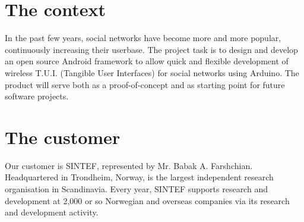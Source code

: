 \section{The context}
In the past few years, social networks have become more and more popular, continuously increasing their userbase.
The project task is to design and develop an open source Android framework to allow quick and flexible
development of wireless T.U.I. (Tangible User Interfaces) for social networks using Arduino.
The product will serve both as a proof-of-concept and as starting point for future software projects.
\section{The customer}
Our customer is SINTEF, represented by Mr. Babak A. Farshchian.
Headquartered in Trondheim, Norway, is the largest independent research organisation in Scandinavia.
Every year, SINTEF supports research and development at 2,000 or so Norwegian and overseas
companies via its research and development activity.